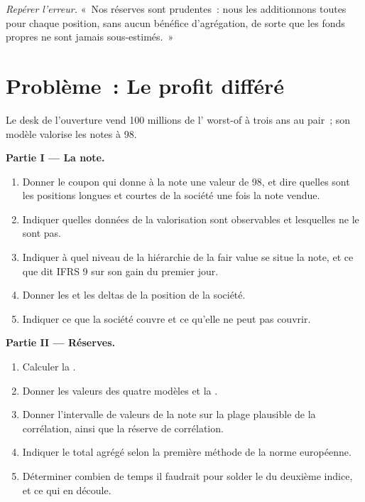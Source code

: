 \begin{exercise}[$\star\star\star$]\label{exo:dv:managing-an-exotic-book:8}
\emph{Repérer l'erreur.} «~Nos réserves sont prudentes~: nous les additionnons toutes pour chaque position, sans aucun bénéfice d'agrégation, de sorte que les fonds propres ne sont jamais sous-estimés.~»
\end{exercise}

\section{Problème~: Le profit différé}

\begin{problem}\label{pb:dv:managing-an-exotic-book:1}
Le desk de l'ouverture vend 100 millions de l' worst-of à trois ans au pair~; son modèle valorise les notes à 98.

\medskip\noindent\textbf{Partie I --- La note.}
\begin{enumerate}
\item Donner le coupon qui donne à la note une valeur de 98, et dire quelles sont les positions longues et courtes de la société une fois la note vendue.
\item Indiquer quelles données de la valorisation sont observables et lesquelles ne le sont pas.
\item Indiquer à quel niveau de la hiérarchie de la fair value se situe la note, et ce que dit IFRS 9 sur son gain du premier jour.
\item Donner les  et les deltas de la position de la société.
\item Indiquer ce que la société couvre et ce qu'elle ne peut pas couvrir.
\end{enumerate}

\medskip\noindent\textbf{Partie II --- Réserves.}
\begin{enumerate}[resume]
\item Calculer la .
\item Donner les valeurs des quatre modèles et la .
\item Donner l'intervalle de valeurs de la note sur la plage plausible de la corrélation, ainsi que la réserve de corrélation.
\item Indiquer le total agrégé selon la première méthode de la norme européenne.
\item Déterminer combien de temps il faudrait pour solder le  du deuxième indice, et ce qui en découle.
\end{enumerate}


\end{problem}
